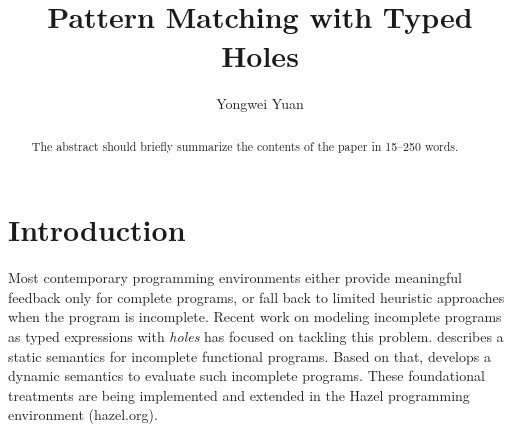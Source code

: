 \documentclass[runningheads,envcountsame,a4paper]{llncs}
\begin{document}
  
\title{Pattern Matching with Typed Holes}

\author{
  Yongwei Yuan \and 
}


\maketitle

\begin{abstract}
  The abstract should briefly summarize the contents of the paper in
  15--250 words.
  
\end{abstract}

\section{Introduction}
\label{sec:intro}
Most contemporary programming environments either provide meaningful feedback only for complete programs, or fall back to limited heuristic approaches when the program is incomplete.
Recent work on modeling incomplete programs as typed expressions with \emph{holes} has focused on tackling this problem. \cite{DBLP:conf/popl/OmarVHAH17} describes a static semantics for incomplete functional programs. Based on that, \cite{DBLP:journals/pacmpl/OmarVCH19} develops a dynamic semantics to evaluate such incomplete programs.
These foundational treatments are being implemented and extended in the Hazel programming environment (hazel.org).
\end{document}
